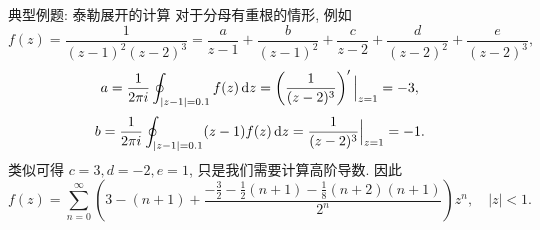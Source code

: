 \begin{frame}{典型例题: 泰勒展开的计算\noexer}
	\onslide<+->
	对于分母有重根的情形, 例如
	\onslide<+->
	\[f(z)=\dfrac{1}{(z-1)^2(z-2)^3}=\frac{a}{z-1}+\frac{b}{(z-1)^2}+\frac{c}{z-2}+\frac{d}{(z-2)^2}+\frac{e}{(z-2)^3},\]
	\onslide<+->
	\[a=\frac1{2\pi i} \oint_{|z-1|=0.1}f(z)\,\mathrm{d} z=\left(\dfrac{1}{(z-2)^3}\right)'\Big|_{z=1}=-3,\]
	\onslide<+->
	\[b=\frac1{2\pi i} \oint_{|z-1|=0.1}(z-1)f(z)\,\mathrm{d} z=\dfrac{1}{(z-2)^3}\Big|_{z=1}=-1.\]
	\onslide<+->
	类似可得 $c=3,d=-2,e=1$, 只是我们需要计算高阶导数.
	\onslide<+->
	因此
	\[f(z)=\sum_{n=0}^\infty\left(3-(n+1)+\frac{-\frac32-\frac12(n+1)-\frac18(n+2)(n+1)}{2^n}\right)z^n,\quad |z|<1.\]
\end{frame}

